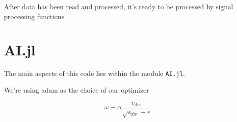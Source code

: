 After data has been read and processed, it's ready to be processed by signal processing functions 

\section{AI.jl}

The main aspects of this code lies within the module \texttt{AI.jl}. 






We're using \acrfull{adam} as the choice of our optimizer

\begin{equation}
    \omega - \alpha \frac{v_{dw}}  {\sqrt{s_{dw}} + \epsilon}
\end{equation}